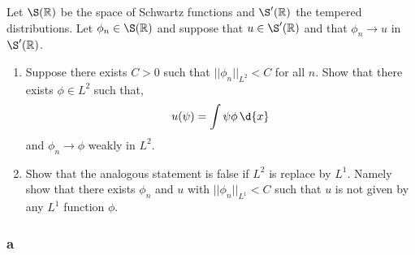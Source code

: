 \documentclass[12pt]{article}
\newcommand{\R}{\mathbb{R}}
\begin{document}
\begin{exercise}
Let $\S(\R)$ be the space of Schwartz functions and $\S'(\R)$ the tempered distributions. Let $\phi_n \in \S(\R)$ and suppose that $u \in \S'(\R)$ and that $\phi_n \to u$ in $\S'(\R)$.
\begin{enumerate}
\item Suppose there exists $C > 0$ such that $|| \phi_n ||_{L^2} < C$ for all $n$. Show that there exists $\phi \in L^2$ such that,
\[ u(\psi) = \int \psi \phi \, \d{x} \]
and $\phi_n \to \phi$ weakly in $L^2$.
\item Show that the analogous statement is false if $L^2$ is replace by $L^1$. Namely show that there exists $\phi_n$ and $u$ with $|| \phi_n ||_{L^1} < C$ such that $u$ is not given by any $L^1$ function $\phi$.
\end{enumerate}
\end{exercise}

\subsubsection{a}
\end{document}
